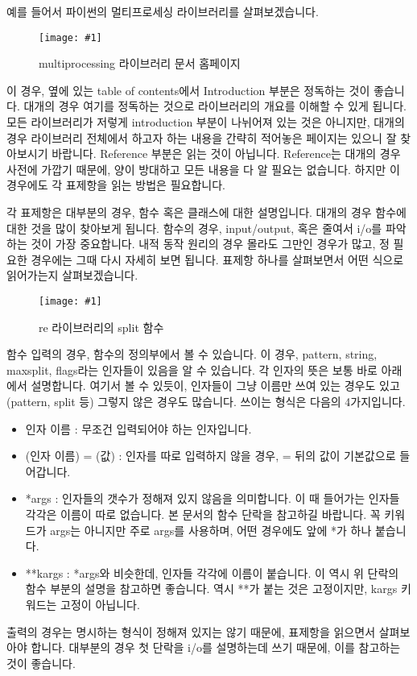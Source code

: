 \documentclass[twoside]{article}
\newcommand\fig[2]{
\begin{figure}[h]
  \centering
  \texttt{[image: \#1]}
  \caption{#2} 
  \label{fig:#1}
\end{figure}
}
\begin{document}
예를 들어서 파이썬의 멀티프로세싱 라이브러리를 살펴보겠습니다. 

\fig{mp}{multiprocessing 라이브러리 문서 홈페이지} 

이 경우, 옆에 있는 table of contents에서 Introduction 부분은 정독하는 것이 좋습니다. 대개의 경우 여기를 정독하는 것으로 라이브러리의 개요를 이해할 수 있게 됩니다. 모든 라이브러리가 저렇게 introduction 부분이 나뉘어져 있는 것은 아니지만, 대개의 경우 라이브러리 전체에서 하고자 하는 내용을 간략히 적어놓은 페이지는 있으니 잘 찾아보시기 바랍니다. Reference 부분은 읽는 것이 아닙니다. Reference는 대개의 경우 사전에 가깝기 때문에, 양이 방대하고 모든 내용을 다 알 필요는 없습니다. 하지만 이 경우에도 각 표제항을 읽는 방법은 필요합니다. 

각 표제항은 대부분의 경우, 함수 혹은 클래스에 대한 설명입니다. 대개의 경우 함수에 대한 것을 많이 찾아보게 됩니다. 함수의 경우, input/output, 혹은 줄여서 i/o를 파악하는 것이 가장 중요합니다. 내적 동작 원리의 경우 몰라도 그만인 경우가 많고, 정 필요한 경우에는 그때 다시 자세히 보면 됩니다. 표제항 하나를 살펴보면서 어떤 식으로 읽어가는지 살펴보겠습니다. 

\fig{re_split}{re 라이브러리의 split 함수} 

함수 입력의 경우, 함수의 정의부에서 볼 수 있습니다. 이 경우, pattern, string, maxsplit, flags라는 인자들이 있음을 알 수 있습니다. 각 인자의 뜻은 보통 바로 아래에서 설명합니다. 여기서 볼 수 있듯이, 인자들이 그냥 이름만 쓰여 있는 경우도 있고(pattern, split 등) 그렇지 않은 경우도 많습니다. 쓰이는 형식은 다음의 4가지입니다. 

\begin{itemize}
\item 인자 이름  : 무조건 입력되어야 하는 인자입니다. 
\item (인자 이름) = (값) : 인자를 따로 입력하지 않을 경우, = 뒤의 값이 기본값으로 들어갑니다. 
\item *args : 인자들의 갯수가 정해져 있지 않음을 의미합니다. 이 때 들어가는 인자들 각각은 이름이 따로 없습니다. 본 문서의 함수 단락을 참고하길 바랍니다. 꼭 키워드가 args는 아니지만 주로 args를 사용하며, 어떤 경우에도 앞에 *가 하나 붙습니다. 
\item **kargs : *args와 비슷한데, 인자들 각각에 이름이 붙습니다. 이 역시 위 단락의 함수 부분의 설명을 참고하면 좋습니다. 역시 **가 붙는 것은 고정이지만, kargs 키워드는 고정이 아닙니다. 
\end{itemize}

출력의 경우는 명시하는 형식이 정해져 있지는 않기 때문에, 표제항을 읽으면서 살펴보아야 합니다. 대부분의 경우 첫 단락을 i/o를 설명하는데 쓰기 때문에, 이를 참고하는 것이 좋습니다. 
\end{document}
